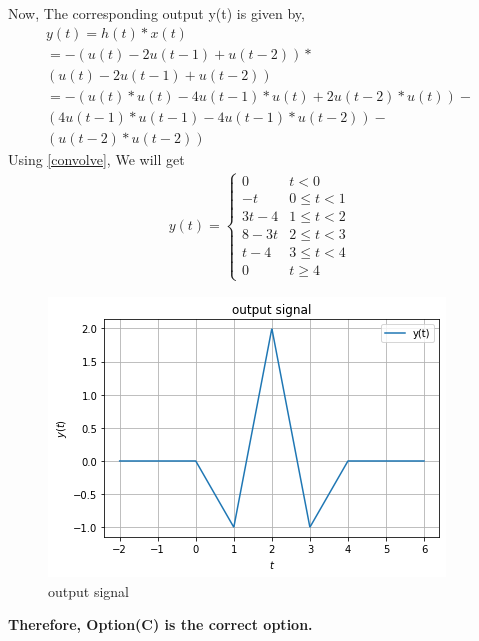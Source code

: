 \documentclass[journal,12pt,twocolumn]{IEEEtran}
\begin{document}
Now, The corresponding output y(t) is given by,
\begin{multline}
    y(t) = h(t) * x(t)\\
    = -(u(t)-2u(t-1)+u(t-2))*\\(u(t)-2u(t-1)+u(t-2))\\
   = -(u(t)*u(t)-4u(t-1)*u(t)+2u(t-2)*u(t))-\\(4u(t-1)*u(t-1)-4u(t-1)*u(t-2))-\\(u(t-2)*u(t-2))
\end{multline}
Using \ref{convolve}, We will get
\begin{align}
    y(t) = \begin{cases}
    0 & t<0\\
    -t & 0\le t < 1\\
    3t-4 & 1\le t <2 \\
    8-3t & 2\le t < 3\\
    t-4 & 3\le t<4\\
    0 & t\ge 4
    \end{cases}
\end{align}
 \begin{figure}[!htp]
\centering
 \includegraphics[width=\columnwidth]{output.png}
 \caption{output signal}
 \end{figure}
 \textbf{Therefore, Option(C) is the correct option.}
\end{document}

